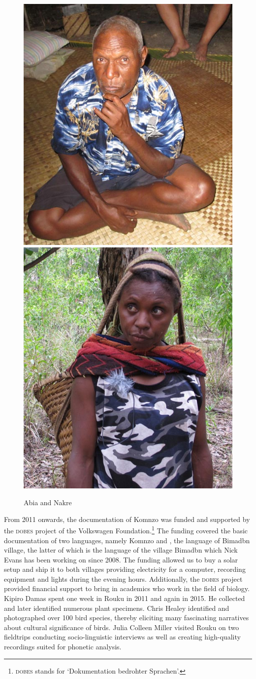 \begin{figure}
	\includegraphics[width=.4\textwidth]{figures/foto-abia.jpg}
	\includegraphics[width=.4\textwidth]{figures/foto-nakre.jpg}
	\caption{Abia and Nakre}
	\label{fig:abia-nakre}
\end{figure}%

From 2011 onwards, the documentation of Komnzo was funded and supported by the \textsc{dobes} project of the Volkswagen Foundation.\footnote{\textsc{dobes} stands for  `Dokumentation bedrohter Sprachen'.} The funding covered the basic documentation of two languages, namely Komnzo and , the language of Bimadbn village, the latter of which is the language of the village Bimadbn which Nick Evans has been working on since 2008. The funding allowed us to buy a solar setup and ship it to both villages providing electricity for a computer, recording equipment and lights during the evening hours. Additionally, the \textsc{dobes} project provided financial support to bring in academics who work in the field of biology. Kipiro Damas spent one week in Rouku in 2011 and again in 2015. He collected and later identified numerous plant specimens. Chris Healey identified and photographed over 100 bird species, thereby eliciting many fascinating narratives about cultural significance of birds. Julia Colleen Miller visited Rouku on two fieldtrips conducting socio-linguistic interviews as well as creating high-quality recordings suited for phonetic analysis.

